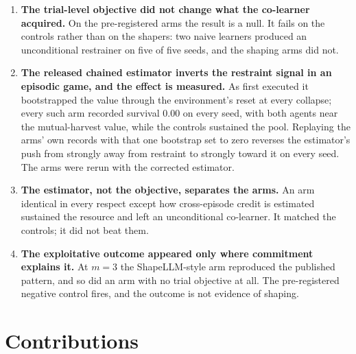 \begin{enumerate}
\item \textbf{The trial-level objective did not change what the co-learner
  acquired.} On the pre-registered arms the result is a null. It fails on the
  controls rather than on the shapers: two naive learners produced an
  unconditional restrainer on five of five seeds, and the shaping arms did
  not.
\item \textbf{The released chained estimator inverts the restraint signal
  in an episodic game, and the effect is measured.} As first executed it
  bootstrapped the value through the environment's reset at every collapse;
  every such arm recorded survival 0.00 on every seed, with both agents near
  the mutual-harvest value, while the controls sustained the pool. Replaying
  the arms' own records with that one bootstrap set to zero reverses the
  estimator's push from strongly away from restraint to strongly toward it
  on every seed. The arms were rerun with the corrected estimator.
\item \textbf{The estimator, not the objective, separates the arms.} An arm
  identical in every respect except how cross-episode credit is estimated
  sustained the resource and left an unconditional co-learner. It matched
  the controls; it did not beat them.
\item \textbf{The exploitative outcome appeared only where commitment
  explains it.} At \(m=3\) the ShapeLLM-style arm reproduced the published
  pattern, and so did an arm with no trial objective at all. The
  pre-registered negative control fires, and the outcome is not evidence of
  shaping.
\end{enumerate}

\section{Contributions}
\label{sec:aims-contributions}

